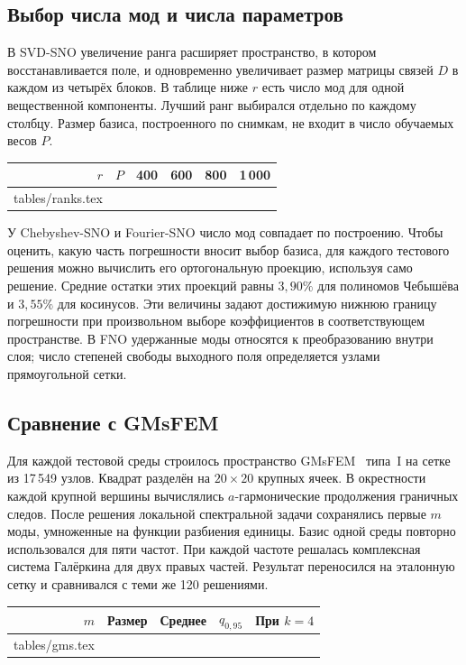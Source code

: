 \documentclass[11pt,a4paper]{article}
\makeatletter
\newenvironment{localtable}{\par\medskip\begingroup\centering\small\renewcommand{\arraystretch}{1.18}}{\par\endgroup\medskip}
\newcommand{\tabinput}[1]{\@@input #1.tex }
\makeatother
\begin{document}
\subsection*{Выбор числа мод и числа параметров}
В SVD-SNO увеличение ранга расширяет пространство, в котором восстанавливается поле, и одновременно увеличивает размер матрицы связей $D$ в каждом из четырёх блоков. В таблице ниже $r$ есть число мод для одной вещественной компоненты. Лучший ранг выбирался отдельно по каждому столбцу. Размер базиса, построенного по снимкам, не входит в число обучаемых весов $P$.
\begin{localtable}
\begin{tabular}{rrrrrr}\toprule $r$ & $P$ & 400 & 600 & 800 & 1\,000 \\\midrule
\tabinput{tables/ranks}\bottomrule\end{tabular}
\end{localtable}
У Chebyshev-SNO и Fourier-SNO число мод совпадает по построению. Чтобы оценить, какую часть погрешности вносит выбор базиса, для каждого тестового решения можно вычислить его ортогональную проекцию, используя само решение. Средние остатки этих проекций равны $3{,}90\%$ для полиномов Чебышёва и $3{,}55\%$ для косинусов. Эти величины задают достижимую нижнюю границу погрешности при произвольном выборе коэффициентов в соответствующем пространстве. В FNO удержанные моды относятся к преобразованию внутри слоя; число степеней свободы выходного поля определяется узлами прямоугольной сетки.
\subsection*{Сравнение с GMsFEM}
Для каждой тестовой среды строилось пространство GMsFEM~\cite{gms} типа~I на сетке из 17\,549 узлов. Квадрат разделён на $20\times20$ крупных ячеек. В окрестности каждой крупной вершины вычислялись $a$-гармонические продолжения граничных следов. После решения локальной спектральной задачи сохранялись первые $m$ моды, умноженные на функции разбиения единицы. Базис одной среды повторно использовался для пяти частот. При каждой частоте решалась комплексная система Галёркина для двух правых частей. Результат переносился на эталонную сетку и сравнивался с теми же 120 решениями.
\begin{localtable}
\begin{tabular}{rrrrr}\toprule $m$ & Размер & Среднее & $q_{0{,}95}$ & При $k=4$\\\midrule
\tabinput{tables/gms}\bottomrule\end{tabular}
\end{localtable}

\clearpage
\end{document}

